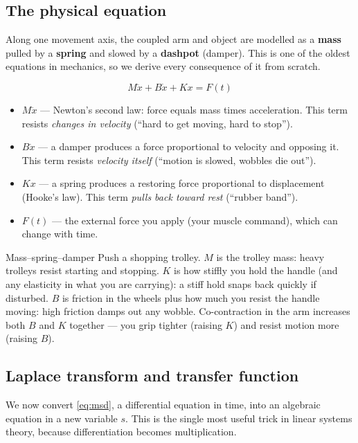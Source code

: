 \documentclass[11pt,a4paper]{article}
\begin{document}
\subsection{The physical equation}

Along one movement axis, the coupled arm and object are modelled as a
\textbf{mass} pulled by a \textbf{spring} and slowed by a \textbf{dashpot}
(damper). This is one of the oldest equations in mechanics, so we derive
every consequence of it from scratch.

\begin{equation}
\boxed{\; M\ddot x + B\dot x + K x = F(t)\;}
\label{eq:msd}
\end{equation}

\begin{itemize}[nosep]
\item $M\ddot x$ --- Newton's second law: force equals mass times acceleration.
  This term resists \emph{changes in velocity} (``hard to get moving, hard to
  stop'').
\item $B\dot x$ --- a damper produces a force proportional to velocity and
  opposing it. This term resists \emph{velocity itself} (``motion is slowed,
  wobbles die out'').
\item $Kx$ --- a spring produces a restoring force proportional to
  displacement (Hooke's law). This term \emph{pulls back toward rest}
  (``rubber band'').
\item $F(t)$ --- the external force you apply (your muscle command), which can
  change with time.
\end{itemize}

\begin{examplebox}{Mass--spring--damper}
Push a shopping trolley. $M$ is the trolley mass: heavy trolleys resist
starting and stopping. $K$ is how stiffly you hold the handle (and any
elasticity in what you are carrying): a stiff hold snaps back quickly if
disturbed. $B$ is friction in the wheels plus how much you resist the handle
moving: high friction damps out any wobble. Co-contraction in the arm
increases both $B$ and $K$ together --- you grip tighter (raising $K$) and
resist motion more (raising $B$).
\end{examplebox}

\subsection{Laplace transform and transfer function}

We now convert \eqref{eq:msd}, a differential equation in time, into an
algebraic equation in a new variable $s$. This is the single most useful trick
in linear systems theory, because differentiation becomes multiplication.
\end{document}
